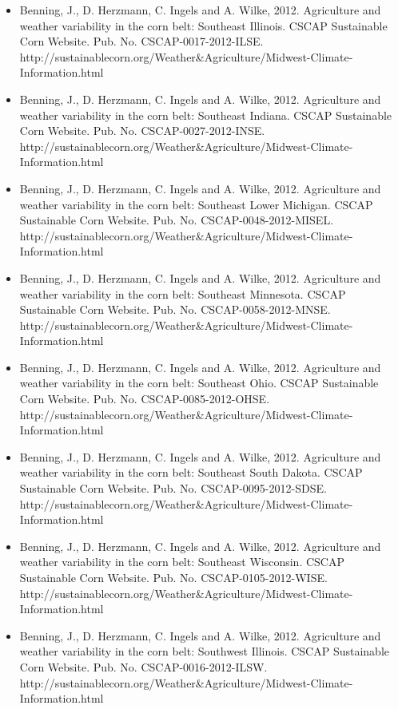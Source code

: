 \begin{itemize}
\item Benning, J., D. Herzmann, C. Ingels and A. Wilke, 2012. Agriculture and weather variability in the corn belt: Southeast Illinois. CSCAP Sustainable Corn Website. Pub. No. CSCAP-0017-2012-ILSE. http://sustainablecorn.org/Weather\&Agriculture/Midwest-Climate-Information.html

\item Benning, J., D. Herzmann, C. Ingels and A. Wilke, 2012. Agriculture and weather variability in the corn belt: Southeast Indiana. CSCAP Sustainable Corn Website. Pub. No. CSCAP-0027-2012-INSE. http://sustainablecorn.org/Weather\&Agriculture/Midwest-Climate-Information.html

\item Benning, J., D. Herzmann, C. Ingels and A. Wilke, 2012. Agriculture and weather variability in the corn belt: Southeast Lower Michigan. CSCAP Sustainable Corn Website. Pub. No. CSCAP-0048-2012-MISEL. http://sustainablecorn.org/Weather\&Agriculture/Midwest-Climate-Information.html

\item Benning, J., D. Herzmann, C. Ingels and A. Wilke, 2012. Agriculture and weather variability in the corn belt: Southeast Minnesota. CSCAP Sustainable Corn Website. Pub. No. CSCAP-0058-2012-MNSE. http://sustainablecorn.org/Weather\&Agriculture/Midwest-Climate-Information.html

\item Benning, J., D. Herzmann, C. Ingels and A. Wilke, 2012. Agriculture and weather variability in the corn belt: Southeast Ohio. CSCAP Sustainable Corn Website. Pub. No. CSCAP-0085-2012-OHSE. http://sustainablecorn.org/Weather\&Agriculture/Midwest-Climate-Information.html

\item Benning, J., D. Herzmann, C. Ingels and A. Wilke, 2012. Agriculture and weather variability in the corn belt: Southeast South Dakota. CSCAP Sustainable Corn Website. Pub. No. CSCAP-0095-2012-SDSE. http://sustainablecorn.org/Weather\&Agriculture/Midwest-Climate-Information.html

\item Benning, J., D. Herzmann, C. Ingels and A. Wilke, 2012. Agriculture and weather variability in the corn belt: Southeast Wisconsin. CSCAP Sustainable Corn Website. Pub. No. CSCAP-0105-2012-WISE. http://sustainablecorn.org/Weather\&Agriculture/Midwest-Climate-Information.html

\item Benning, J., D. Herzmann, C. Ingels and A. Wilke, 2012. Agriculture and weather variability in the corn belt: Southwest Illinois. CSCAP Sustainable Corn Website. Pub. No. CSCAP-0016-2012-ILSW. http://sustainablecorn.org/Weather\&Agriculture/Midwest-Climate-Information.html


\end{itemize}
